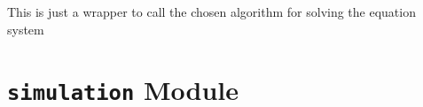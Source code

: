 \documentclass[letterpaper,10pt,english]{sphinxmanual}
\begin{document}
\begin{fulllineitems}
\begin{fulllineitems}
\end{fulllineitems}


\begin{fulllineitems}
\label{pytrajectory:pytrajectory.solver.Solver.newton}
\end{fulllineitems}


\begin{fulllineitems}
\label{pytrajectory:pytrajectory.solver.Solver.solve}
This is just a wrapper to call the chosen algorithm for solving the
equation system

\end{fulllineitems}


\end{fulllineitems}



\section{\texttt{simulation} Module}
\label{pytrajectory:module-pytrajectory.simulation}\label{pytrajectory:simulation-module}
\end{document}
